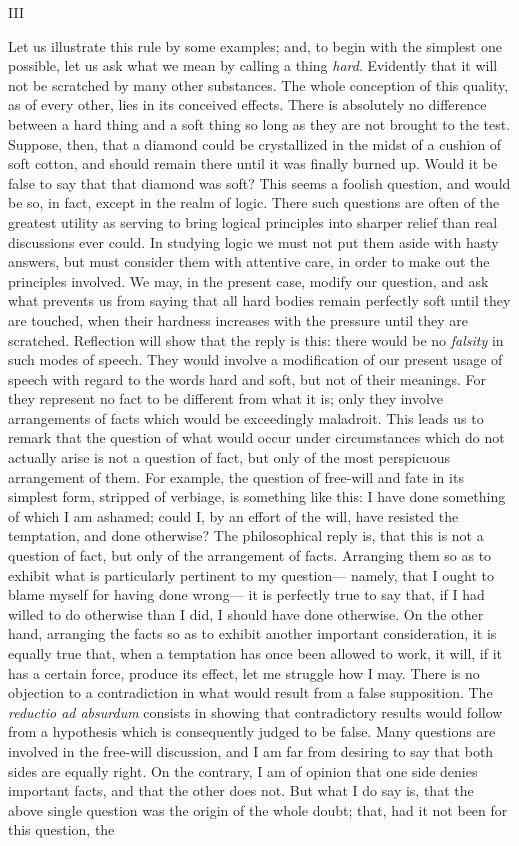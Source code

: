 \documentclass[]{article}
\newcommand{\itemsection}[1]{\bigskip\centerline{#1}\nopagebreak}
\begin{document}
\itemsection{III}

Let us illustrate this rule by some examples; and, to begin with the simplest one possible, let us ask what we mean by calling a thing \emph{hard}. Evidently that it will not be scratched by many other substances. The whole conception of this quality, as of every other, lies in its conceived effects. There is absolutely no difference between a hard thing and a soft thing so long as they are not brought to the test. Suppose, then, that a diamond could be crystallized in the midst of a cushion of soft cotton, and should remain there until it was finally burned up. Would it be false to say that that diamond was soft? This seems a foolish question, and would be so, in fact, except in the realm of logic. There such questions are often of the greatest utility as serving to bring logical principles into sharper relief than real discussions ever could. In studying logic we must not put them aside with hasty answers, but must consider them with attentive care, in order  to make out the principles involved. We may, in the present case, modify our question, and ask what prevents us from saying that all hard bodies remain perfectly soft until they are touched, when their hardness increases with the pressure until they are scratched. Reflection will show that the reply is this: there would be no \emph{falsity} in such modes of speech. They would involve a modification of our present usage of speech with regard to the words hard and soft, but not of their meanings. For they represent no fact to be different from what it is; only they involve arrangements of facts which would be exceedingly maladroit. This leads us to remark that the question of what would occur under circumstances which do not actually arise is not a question of fact, but only of the most perspicuous arrangement of them. For example, the question of free-will and fate in its simplest form, stripped of verbiage, is something like this: I have done something of which I am ashamed; could I, by an effort of the will, have resisted the temptation, and done otherwise? The philosophical reply is, that this is not a question of fact, but only of the arrangement of facts. Arranging them so as to exhibit what is particularly pertinent to my question--- namely, that I ought to blame myself for having done wrong--- it is perfectly true to say that, if I had willed to do otherwise than I did, I should have done otherwise. On the other hand, arranging the facts so as to exhibit another important consideration, it is equally true that, when a temptation has once been allowed to work, it will, if it has a certain force, produce its effect, let me struggle how I may. There is no objection to a contradiction in what would result from a false supposition. The \emph{reductio ad absurdum} consists in showing that contradictory results would follow from a hypothesis which is consequently judged to be false. Many questions are involved in the free-will discussion, and I am far from desiring to say that both sides are equally right. On the contrary, I am of opinion that one side denies important facts, and that the other does not. But what I do say is, that the above single question was the origin of the whole doubt; that, had it not been for this question, the 
\end{document}
